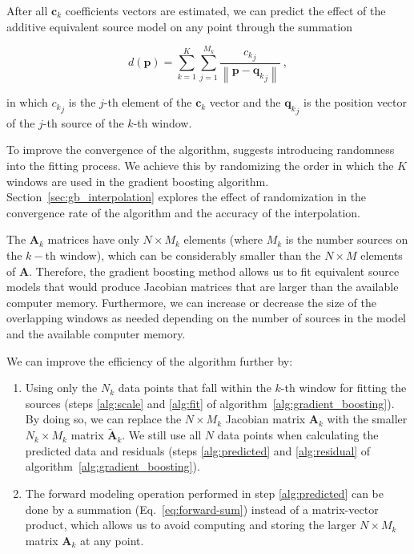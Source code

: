 After all $\mathbf{c}_k$ coefficients vectors are estimated, we can predict the
effect of the additive equivalent source model on any point through the
summation

\begin{equation}
    d(\mathbf{p}) =
    \sum\limits_{k=1}^K \sum\limits_{j=1}^{M_k}
    \frac{{c_k}_j}{\left\lVert \mathbf{p} - {\mathbf{q}_k}_j \right\rVert}
    \ ,
    \label{eq:eql-forward-gb}
\end{equation}

\noindent
in which ${c_k}_j$ is the $j$-th element of the $\mathbf{c}_k$ vector and the
${\mathbf{q}_k}_j$ is the position vector of the $j$-th source of the $k$-th
window.

To improve the convergence of the algorithm, \citet{friedman2002} suggests
introducing randomness into the fitting process. We achieve this by randomizing
the order in which the $K$ windows are used in the gradient boosting algorithm.
Section~\ref{sec:gb_interpolation} explores the effect of randomization in the
convergence rate of the algorithm and the accuracy of the interpolation.

The $\mathbf{A}_k$ matrices have only $N \times M_k$ elements
(where $M_k$ is the number sources on the $k-$th window), which can be
considerably smaller than the $N \times M$ elements of $\mathbf{A}$.
Therefore, the gradient boosting method allows us to fit
equivalent source models that would produce Jacobian matrices that are larger
than the available computer memory.
Furthermore, we can increase or decrease the size of the overlapping windows as
needed depending on the number of sources in the model and the available
computer memory.

We can improve the efficiency of the algorithm further by:

\begin{enumerate}
  \item Using only the $N_k$ data points that fall within the $k$-th window for
    fitting the sources (steps \ref{alg:scale} and \ref{alg:fit} of
    algorithm~\ref{alg:gradient_boosting}).
    By doing so, we can replace the $N \times M_k$ Jacobian matrix $\mathbf{A}_k$
    with the smaller $N_k \times M_k$ matrix $\tilde{\mathbf{A}}_k$.
    We still use all $N$ data points when calculating the predicted data and
    residuals (steps \ref{alg:predicted} and \ref{alg:residual} of
    algorithm~\ref{alg:gradient_boosting}).
  \item The forward modeling operation performed in step \ref{alg:predicted}
    can be done by a summation (Eq.~\ref{eq:forward-sum}) instead of a
    matrix-vector product, which allows us to avoid computing and storing the
    larger $N \times M_k$ matrix $\mathbf{A}_k$ at any point.
\end{enumerate}

